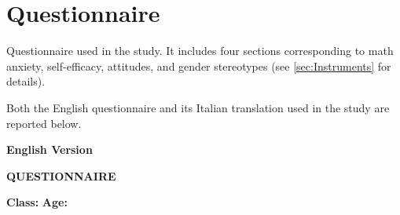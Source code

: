 \appendix
\chapter{Questionnaire}\label{app:questionnaire}

Questionnaire used in the study. It includes four sections corresponding to math anxiety, self-efficacy, attitudes, and gender stereotypes (see \autoref{sec:Instruments} for details).

Both the English questionnaire and its Italian translation used in the study are reported below.

\newpage
{}

\setlength{\headwidth}{\textwidth}
\fancyhfoffset{0pt}

\begin{center}
  { \textbf{English Version}}
\end{center}

\noindent
\begin{minipage}{0.65\textwidth}
  {\Large \textbf{QUESTIONNAIRE}}
\end{minipage}
\hfill
\begin{minipage}{0.30\textwidth}
  \raggedleft
  \textbf{Class:} \underline{\hspace{1cm}} \textbf{Age:} \underline{\hspace{0.8cm}}
\end{minipage}

\vspace{0.2cm}

